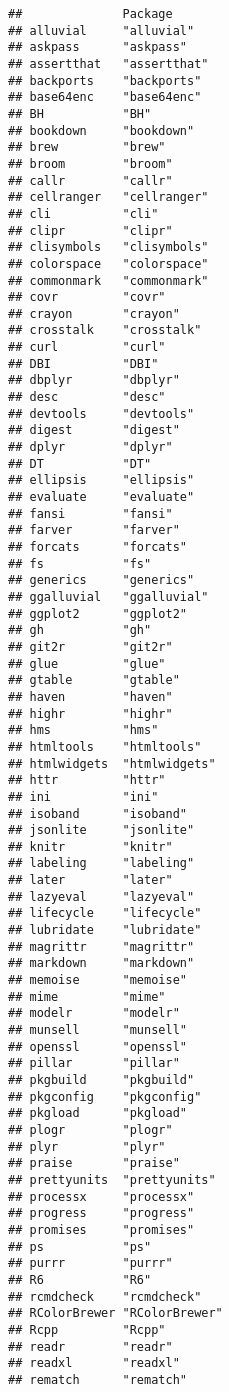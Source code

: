 \documentclass[]{book}
\begin{document}
\begin{verbatim}
##              Package       
## alluvial     "alluvial"    
## askpass      "askpass"     
## assertthat   "assertthat"  
## backports    "backports"   
## base64enc    "base64enc"   
## BH           "BH"          
## bookdown     "bookdown"    
## brew         "brew"        
## broom        "broom"       
## callr        "callr"       
## cellranger   "cellranger"  
## cli          "cli"         
## clipr        "clipr"       
## clisymbols   "clisymbols"  
## colorspace   "colorspace"  
## commonmark   "commonmark"  
## covr         "covr"        
## crayon       "crayon"      
## crosstalk    "crosstalk"   
## curl         "curl"        
## DBI          "DBI"         
## dbplyr       "dbplyr"      
## desc         "desc"        
## devtools     "devtools"    
## digest       "digest"      
## dplyr        "dplyr"       
## DT           "DT"          
## ellipsis     "ellipsis"    
## evaluate     "evaluate"    
## fansi        "fansi"       
## farver       "farver"      
## forcats      "forcats"     
## fs           "fs"          
## generics     "generics"    
## ggalluvial   "ggalluvial"  
## ggplot2      "ggplot2"     
## gh           "gh"          
## git2r        "git2r"       
## glue         "glue"        
## gtable       "gtable"      
## haven        "haven"       
## highr        "highr"       
## hms          "hms"         
## htmltools    "htmltools"   
## htmlwidgets  "htmlwidgets" 
## httr         "httr"        
## ini          "ini"         
## isoband      "isoband"     
## jsonlite     "jsonlite"    
## knitr        "knitr"       
## labeling     "labeling"    
## later        "later"       
## lazyeval     "lazyeval"    
## lifecycle    "lifecycle"   
## lubridate    "lubridate"   
## magrittr     "magrittr"    
## markdown     "markdown"    
## memoise      "memoise"     
## mime         "mime"        
## modelr       "modelr"      
## munsell      "munsell"     
## openssl      "openssl"     
## pillar       "pillar"      
## pkgbuild     "pkgbuild"    
## pkgconfig    "pkgconfig"   
## pkgload      "pkgload"     
## plogr        "plogr"       
## plyr         "plyr"        
## praise       "praise"      
## prettyunits  "prettyunits" 
## processx     "processx"    
## progress     "progress"    
## promises     "promises"    
## ps           "ps"          
## purrr        "purrr"       
## R6           "R6"          
## rcmdcheck    "rcmdcheck"   
## RColorBrewer "RColorBrewer"
## Rcpp         "Rcpp"        
## readr        "readr"       
## readxl       "readxl"      
## rematch      "rematch"     

\end{verbatim}
\end{document}
